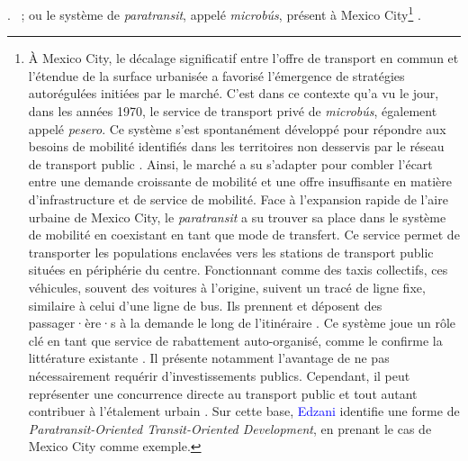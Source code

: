 \begin{refsegment}
{\textcolor{blue}{\autocite[11]{currie_bus_2006}}.
}~; ou le système de \textsl{paratransit}, appelé \textsl{microbús}, présent à Mexico City\footnote{
    À Mexico City, le décalage significatif entre l’offre de transport en commun et l’étendue de la surface urbanisée a favorisé l’émergence de stratégies autorégulées initiées par le marché. C’est dans ce contexte qu’a vu le jour, dans les années 1970, le service de transport privé de \textsl{microbús}, également appelé \textsl{pesero}. Ce système s’est spontanément développé pour répondre aux besoins de mobilité identifiés dans les territoires non desservis par le réseau de transport public \textcolor{blue}{\autocite[p.~379-399 (chapitre 15)]{cervero_transit_1998}}. Ainsi, le marché a su s’adapter pour combler l’écart entre une demande croissante de mobilité et une offre insuffisante en matière d'infrastructure et de service de mobilité. Face à l’expansion rapide de l’aire urbaine de Mexico City, le \textsl{paratransit} a su trouver sa place dans le système de mobilité en coexistant en tant que mode de transfert. Ce service permet de transporter les populations enclavées vers les stations de transport public situées en périphérie du centre. Fonctionnant comme des taxis collectifs, ces véhicules, souvent des voitures à l’origine, suivent un tracé de ligne fixe, similaire à celui d’une ligne de bus. Ils prennent et déposent des passager·ère·s à la demande le long de l'\gls{itinéraire} \textcolor{blue}{\autocite[4]{chiu_does_2022}}. Ce système  joue un rôle clé en tant que service de rabattement auto-organisé, comme le confirme la littérature existante \textcolor{blue}{\autocite[98, 246]{adjeroud_coexistence_2024}}. Il présente notamment l'avantage de ne pas nécessairement requérir d'investissements publics. Cependant, il peut représenter une concurrence directe au transport public  et tout autant contribuer à l’étalement urbain \textcolor{blue}{\autocite[4]{chiu_does_2022}}. Sur cette base, \textcolor{blue}{Edzani} \textcolor{blue}{\textcite[65]{libunyu_paratransit-oriented_2024}} identifie une forme de \textsl{Paratransit-Oriented Transit-Oriented Development}, en prenant le cas de Mexico City comme exemple.
} \textcolor{blue}{\autocite[343-399]{cervero_transit_1998}}.%


\end{refsegment}
